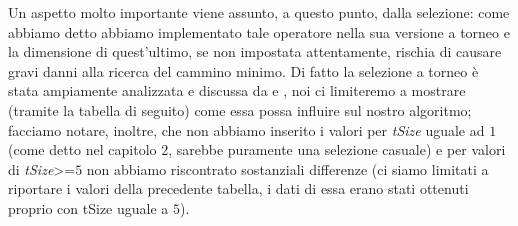 Un aspetto molto importante viene assunto, a questo punto, dalla selezione: come abbiamo detto abbiamo implementato tale operatore nella sua versione a torneo e la dimensione di quest'ultimo, se non impostata attentamente, rischia di causare gravi danni alla ricerca del cammino minimo. Di fatto la selezione a torneo \`e stata ampiamente analizzata e discussa da \cite{selection1} e \cite{selection2}, noi ci limiteremo a mostrare (tramite la tabella di seguito) come essa possa influire sul nostro algoritmo; facciamo notare, inoltre, che non abbiamo inserito i valori per \textit{tSize} uguale ad $1$ (come detto nel capitolo $2$, sarebbe puramente una selezione casuale) e per valori di \textit{tSize}>=$5$ non abbiamo riscontrato sostanziali differenze (ci siamo limitati a riportare i valori della precedente tabella, i dati di essa erano stati ottenuti proprio con tSize uguale a $5$).
